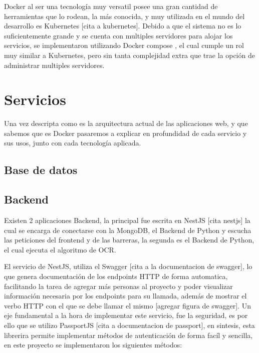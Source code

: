 Docker al ser una tecnología muy versatil posee una gran cantidad de herramientas que lo rodean, la más conocida, y muy utilizada en el mundo del desarrollo es Kubernetes [cita a kubernetes]. Debido a que el sistema no es lo suficientemente grande y se cuenta con multiples servidores para alojar los servicios, se implementaron utilizando Docker compose \cite{noauthor_docker_2023}, el cual cumple un rol muy similar a Kubernetes, pero sin tanta complejidad extra que trae la opción de administrar multiples servidores.

\section{Servicios}

Una vez descripta como es la arquitectura actual de las aplicaciones web, y que sabemos que es Docker pasaremos a explicar en profundidad de cada servicio y sus usos, junto con cada tecnología aplicada.

\subsection{Base de datos}
\subsection{Backend}

Existen 2 aplicaciones Backend, la principal fue escrita en NestJS [cita nestjs] la cual se encarga de conectarse con la MongoDB, el Backend de Python y escucha las peticiones del frontend y de las barreras, la segunda es el Backend de Python, el cual ejecuta el algoritmo de OCR.

El servicio de NestJS, utiliza el Swagger [cita  a la documentacion de swagger], lo que genera documentación de los endpoints HTTP de forma automatica, facilitando la tarea de agregar más personas al proyecto y poder visualizar información necesaria por los endpoints para su llamada, además de mostrar el verbo HTTP con el que se debe llamar el mismo [agregar figura de swagger]. Un eje fundamental a la hora de implementar este servicio, fue la seguridad, es por ello que se utilizo PassportJS [cita a documentacion de passport], en sintesis, esta librerira permite implementar métodos de autenticación de forma facíl y sencilla, en este proyecto se implementaron los siguientes métodos:

